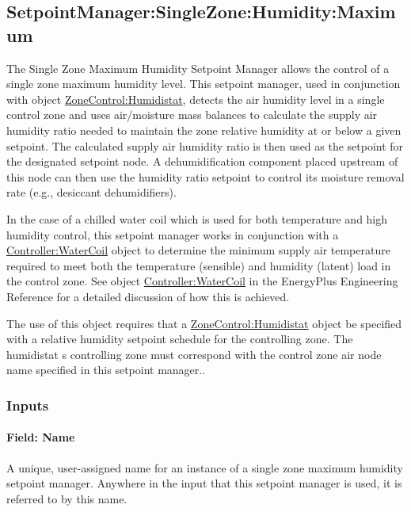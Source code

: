\subsection{SetpointManager:SingleZone:Humidity:Maximum}\label{setpointmanagersinglezonehumiditymaximum}

The Single Zone Maximum Humidity Setpoint Manager allows the control of a single zone maximum humidity level. This setpoint manager, used in conjunction with object \hyperref[zonecontrolhumidistat]{ZoneControl:Humidistat}, detects the air humidity level in a single control zone and uses air/moisture mass balances to calculate the supply air humidity ratio needed to maintain the zone relative humidity at or below a given setpoint. The calculated supply air humidity ratio is then used as the setpoint for the designated setpoint node. A dehumidification component placed upstream of this node can then use the humidity ratio setpoint to control its moisture removal rate (e.g., desiccant dehumidifiers).

In the case of a chilled water coil which is used for both temperature and high humidity control, this setpoint manager works in conjunction with a \hyperref[controllerwatercoil]{Controller:WaterCoil} object to determine the minimum supply air temperature required to meet both the temperature (sensible) and humidity (latent) load in the control zone. See object \hyperref[controllerwatercoil]{Controller:WaterCoil} in the EnergyPlus Engineering Reference for a detailed discussion of how this is achieved.

The use of this object requires that a \hyperref[zonecontrolhumidistat]{ZoneControl:Humidistat} object be specified with a relative humidity setpoint schedule for the controlling zone. The humidistat s controlling zone must correspond with the control zone air node name specified in this setpoint manager..

\subsubsection{Inputs}\label{inputs-7-024}

\paragraph{Field: Name}\label{field-name-7-019}

A unique, user-assigned name for an instance of a single zone maximum humidity setpoint manager. Anywhere in the input that this setpoint manager is used, it is referred to by this name.

